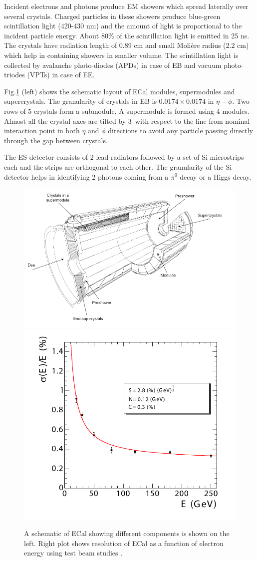Incident electrons and photons produce EM showers which spread laterally over several crystals. Charged particles in these showers produce 
blue-green scintillation light (420-430 nm) and the amount of light is proportional to the incident particle energy. About 80\% of the 
scintillation light is emitted in 25 ns. The crystals have radiation length of 0.89 cm and small Molière radius (2.2 cm) which help in 
containing showers in smaller volume. The scintillation light is collected by avalanche photo-diodes (APDs) in case of EB and vacuum 
photo-triodes (VPTs) in case of EE. 

Fig.\ref{fig:Ecal_sche_res} (left) shows the schematic layout of ECal modules, supermodules and supercrystals. The granularity of crystals 
in EB is $0.0174\times 0.0174$ in $\eta-\phi$. Two rows of 5 crystals form a submodule, A supermodule is formed using 4 modules. Almost 
all the crystal axes are tilted by 3\textdegree\ with respect to the line from nominal interaction point in both $\eta$ and $\phi$ 
directions to avoid any particle passing directly through the gap between crystals.

The ES detector consists of 2 lead radiators followed by a set of Si microstrips each and the strips are orthogonal to each other.
The granularity of the Si detector helps in identifying 2 photons coming from a $\pi^0$ decay or a Higgs decay.
\begin{figure}[h!]
\centering
\includegraphics[width=0.59\linewidth]{../Figures/Chap2/Ecal_schematic}
\includegraphics[width=0.4\linewidth]{../Figures/Chap2/ecalResolution}
\captionsetup{width=.95\linewidth}
\caption[ECal schematic and resolution]{A schematic of ECal showing different components is shown on the left. 
Right plot shows resolution of ECal as a function of electron energy using test beam studies \cite{Chatrchyan:2008aa}.}
\label{fig:Ecal_sche_res}
\end{figure}

